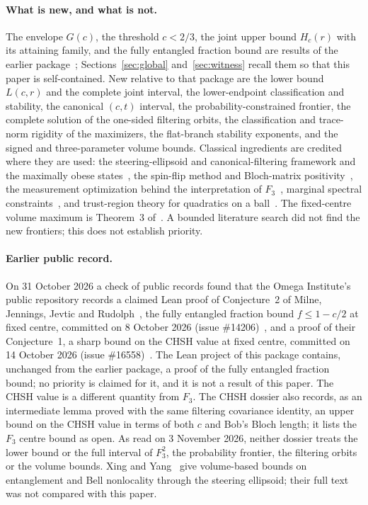 \documentclass[11pt,a4paper]{article}
\theoremstyle{remark}\newtheorem{remark}[theorem]{Remark}
\begin{document}
\paragraph{What is new, and what is not.} The envelope $G(c)$, the
threshold $c<2/3$, the joint upper bound $H_c(r)$ with its attaining
family, and the fully entangled fraction bound are results of the earlier
package~\cite{earlier}; Sections~\ref{sec:global} and~\ref{sec:witness}
recall them so that this paper is self-contained. New relative to that
package are the lower bound $L(c,r)$ and the complete joint interval, the
lower-endpoint classification and stability, the canonical $(c,t)$
interval, the probability-constrained frontier, the complete solution of
the one-sided filtering orbits, the classification and trace-norm rigidity
of the maximizers, the flat-branch stability exponents, and the signed and
three-parameter volume bounds. Classical ingredients are credited where
they are used: the steering-ellipsoid and canonical-filtering framework
and the maximally obese states~\cite{jevtic,milne,milnevolume}, the
spin-flip method and Bloch-matrix positivity~\cite{milne,jevtic,gamel},
the measurement optimization behind the interpretation of
$F_3$~\cite{costa}, marginal spectral constraints~\cite{bravyi}, and
trust-region theory for quadratics on a ball~\cite{more,fortin}.
The fixed-centre volume maximum is Theorem~3 of~\cite{milnevolume}.
A bounded literature search did not find the new frontiers; this does not
establish priority.

\paragraph{Earlier public record.} On 31 October 2026 a check of public
records found that the Omega Institute's public repository records a
claimed Lean proof of Conjecture~2 of Milne, Jennings, Jevtic and
Rudolph~\cite{milne}, the fully entangled fraction bound $f\leq1-c/2$ at
fixed centre, committed on 8 October 2026 (issue \#14206)~\cite{omegafef},
and a proof of their Conjecture~1, a sharp bound on the CHSH value at fixed
centre, committed on 14 October 2026 (issue \#16558)~\cite{omegachsh}.
The Lean project of this package contains, unchanged from the earlier
package, a proof of the fully entangled fraction bound; no priority is
claimed for it, and it is not a result of this paper. The CHSH value is a
different quantity from $F_3$. The CHSH dossier also records, as an
intermediate lemma proved with the same filtering covariance identity, an
upper bound on the CHSH value in terms of both $c$ and Bob's Bloch length;
it lists the $F_3$ centre bound as open. As read on 3 November 2026,
neither dossier treats the lower bound or the full interval of $F_3^2$, the
probability frontier, the filtering orbits or the volume bounds.
Xing and Yang~\cite{xing} give volume-based bounds on entanglement and Bell
nonlocality through the steering ellipsoid; their full text was not
compared with this paper.
\end{document}
